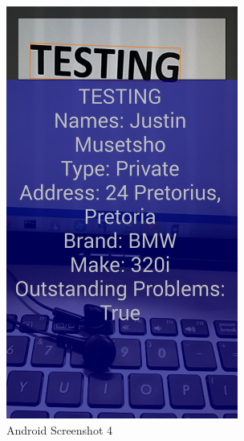 \documentclass[12pt]{article}
\begin{document}
							\begin{figure}[tp]
		                             \centering
		                             \includegraphics[width=3in, height=5.333in]{Pictures/Screenshots_4.png}
		                             \caption{Android Screenshot 4}
		              		\end{figure}                    
                    \FloatBarrier
\end{document}
